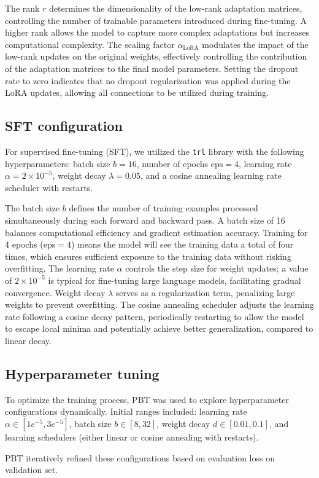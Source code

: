 \documentclass[11pt, onecolumn]{article}
\newcounter{para}
\begin{document}
The rank \( r \) determines the dimensionality of the low-rank adaptation matrices, controlling the number of trainable parameters introduced during fine-tuning. A higher rank allows the model to capture more complex adaptations but increases computational complexity. The scaling factor \( \alpha_{\text{LoRA}} \) modulates the impact of the low-rank updates on the original weights, effectively controlling the contribution of the adaptation matrices to the final model parameters. Setting the dropout rate to zero indicates that no dropout regularization was applied during the LoRA updates, allowing all connections to be utilized during training.

\subsection{SFT configuration}

For supervised fine-tuning (SFT), we utilized the \texttt{trl} library with the following hyperparameters: batch size \( b = 16 \), number of epochs \( \text{eps} = 4 \), learning rate \( \alpha = 2 \times 10^{-5} \), weight decay \( \lambda = 0.05 \), and a cosine annealing learning rate scheduler with restarts.

The batch size \( b \) defines the number of training examples processed simultaneously during each forward and backward pass. A batch size of 16 balances computational efficiency and gradient estimation accuracy. Training for 4 epochs (\( \text{eps} = 4 \)) means the model will see the training data a total of four times, which ensures sufficient exposure to the training data without risking overfitting. The learning rate \( \alpha \) controls the step size for weight updates; a value of \( 2 \times 10^{-5} \) is typical for fine-tuning large language models, facilitating gradual convergence. Weight decay \( \lambda \) serves as a regularization term, penalizing large weights to prevent overfitting. The cosine annealing scheduler adjusts the learning rate following a cosine decay pattern, periodically restarting to allow the model to escape local minima and potentially achieve better generalization, compared to linear decay.

\subsection{Hyperparameter tuning}

To optimize the training process, PBT was used to explore hyperparameter configurations dynamically. Initial ranges included: learning rate $\alpha \in [1e^{-5}, 3e^{-5}]$, batch size $b\in [8,32]$, weight decay $d\in[0.01,0.1]$, and learning schedulers (either linear or cosine annealing with restarts).

PBT iteratively refined these configurations based on evaluation loss on validation set.
\end{document}
